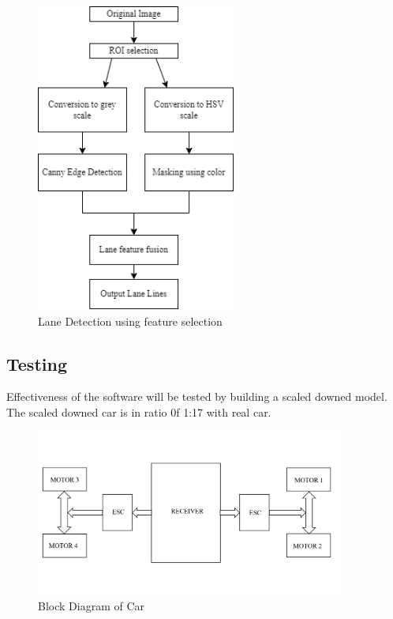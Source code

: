 \begin{figure}[H] %
\begin{center}
	\includegraphics[height = 4in]{images/lane detection.png}
	\caption{Lane Detection using feature selection} %
	\label{figLaneDetectionusingFeatureSelection} %
\end{center}
\end{figure}

\subsection{Testing}
Effectiveness of the software will be tested by building a scaled downed model. The scaled downed car is in ratio 0f 1:17 with real car.
\begin{figure}[H] %
\begin{center}
	\includegraphics[width = 4in]{images/block diagram of car.jpg}
	\caption{Block Diagram of Car} %
	\label{figObjectDetectionusingYOLO} %
\end{center}
\end{figure}


